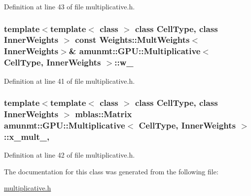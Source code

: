 Definition at line 43 of file multiplicative.\+h.

\subsubsection[{\texorpdfstring{w\+\_\+}{w_}}]{\setlength{\rightskip}{0pt plus 5cm}template$<$template$<$ class $>$ class Cell\+Type, class Inner\+Weights $>$ const {\bf Weights\+::\+Mult\+Weights}$<$Inner\+Weights$>$\& {\bf amunmt\+::\+G\+P\+U\+::\+Multiplicative}$<$ Cell\+Type, Inner\+Weights $>$\+::w\+\_\+\hspace{0.3cm}{\ttfamily [private]}}\hypertarget{classamunmt_1_1GPU_1_1Multiplicative_a32dbf949fdc0b61708b5db19e3416b93}{}\label{classamunmt_1_1GPU_1_1Multiplicative_a32dbf949fdc0b61708b5db19e3416b93}


Definition at line 41 of file multiplicative.\+h.

\subsubsection[{\texorpdfstring{x\+\_\+mult\+\_\+}{x_mult_}}]{\setlength{\rightskip}{0pt plus 5cm}template$<$template$<$ class $>$ class Cell\+Type, class Inner\+Weights $>$ {\bf mblas\+::\+Matrix} {\bf amunmt\+::\+G\+P\+U\+::\+Multiplicative}$<$ Cell\+Type, Inner\+Weights $>$\+::x\+\_\+mult\+\_\+\hspace{0.3cm}{\ttfamily [mutable]}, {\ttfamily [private]}}\hypertarget{classamunmt_1_1GPU_1_1Multiplicative_ac7fc2a007d833891d9be392e4cd79204}{}\label{classamunmt_1_1GPU_1_1Multiplicative_ac7fc2a007d833891d9be392e4cd79204}


Definition at line 42 of file multiplicative.\+h.



The documentation for this class was generated from the following file\+:\begin{DoxyCompactItemize}
\item 
\hyperlink{multiplicative_8h}{multiplicative.\+h}\end{DoxyCompactItemize}
